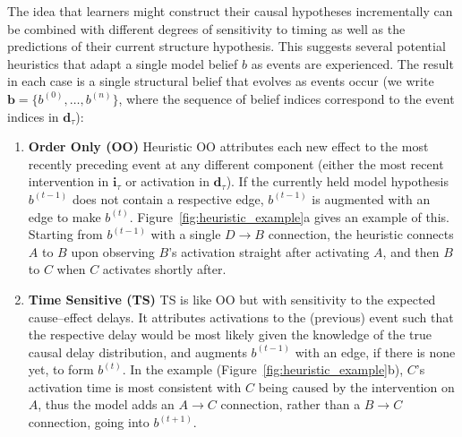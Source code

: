 \documentclass[10pt,letterpaper]{article}
\newcommand{\ci}{\mathbf{i}} %
\newcommand{\da}{\mathbf{d}} %
\begin{document}
The idea that learners might construct their causal hypotheses incrementally can be combined with different degrees of sensitivity to timing as well as the predictions of their current structure hypothesis.  This suggests several potential heuristics that adapt a single model belief $b$ as events are experienced.  The result in each case is a single structural belief that evolves as events occur (we write $\mathbf{b} = \{b^{(0)},\ldots, b^{(n)}\}$, where the sequence of belief indices correspond to the event indices in $\da_{\tau}$):
\begin{enumerate}[topsep=5pt,itemsep=1pt,partopsep=1ex,parsep=1ex]

\item \textbf{Order Only (OO)}  Heuristic OO attributes each new effect to the most recently preceding event at any different component (either the most recent intervention in $\ci_{\tau}$ or activation in $\da_{\tau}$).  If the currently held model hypothesis $b^{(t-1)}$ does not contain a respective edge, $b^{(t-1)}$ is augmented with an edge to make $b^{(t)}$.  Figure~\ref{fig:heuristic_example}a gives an example of this.  Starting from $b^{(t-1)}$ with a single $D\rightarrow B$ connection, the heuristic connects $A$ to $B$ upon observing $B$'s activation straight after activating $A$, and then $B$ to $C$ when $C$ activates shortly after.

\item \textbf{Time Sensitive (TS)} TS is like OO but with sensitivity to the expected cause--effect delays.  It attributes activations to the (previous) event such that the respective delay would be most likely given the knowledge of the true causal delay distribution, and augments $b^{(t-1)}$ with an edge, if there is none yet, to form $b^{(t)}$. 
In the example (Figure~\ref{fig:heuristic_example}b), $C$'s activation time is most consistent with $C$ being caused by the intervention on $A$, thus the model adds an $A\rightarrow C$ connection, rather than a $B\rightarrow C$ connection, going into $b^{(t+1)}$.%


\end{enumerate}
\end{document}

